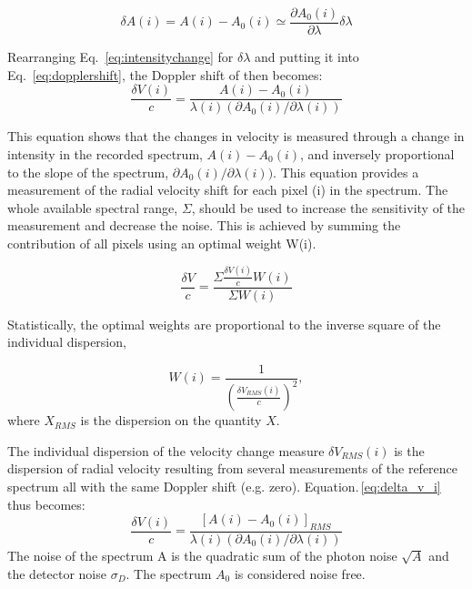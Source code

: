 \begin{equation}
\delta A(i) = A(i) - A_0(i) \simeq \frac{\partial A_0(i)}{\partial \lambda} \delta \lambda
\label{eq:intensitychange}
\end{equation}

Rearranging Eq.~\ref{eq:intensitychange} for \(\delta \lambda\) and putting it into Eq.~\ref{eq:dopplershift}, the Doppler shift of then becomes:
\begin{equation}
    \frac{\delta V(i)}{c} = \frac{A(i) - A_0(i) }{\lambda(i) (\partial A_0(i)/\partial \lambda(i))} \label{eq:delta_v_i}
\end{equation}

This equation shows that the changes in velocity is measured through a change in intensity in the recorded spectrum, \(A(i)-A_0(i)\), and inversely proportional to the slope of the spectrum, \(\partial A_0(i)/\partial \lambda(i))\).
This equation provides a measurement of the radial velocity shift for each pixel (i) in the spectrum. The whole available spectral range, $\Sigma$, should be used to increase the sensitivity of the measurement and decrease the noise. This is achieved by summing the contribution of all pixels using an optimal weight W(i).

\begin{equation}
\frac{\delta V}{c} = \frac{\Sigma{ \frac{\delta V(i)}{c}W(i)}}{\Sigma {W(i)}}
\end{equation}

Statistically, the optimal weights are proportional to the inverse square of the individual dispersion,


\begin{equation}
W(i) = \frac{1}{\left(\frac{\delta V_{RMS}(i)}{c}\right)^2},  \label{eq:weights}
\end{equation}
where $X_{RMS}$ is the dispersion on the quantity $X$.


The individual dispersion of the velocity change measure $\delta V_{RMS}(i)$ is the dispersion of radial velocity resulting from several measurements of the reference spectrum all with the same Doppler shift (e.g. zero). Equation.\,\ref{eq:delta_v_i} thus becomes:
\begin{equation}
    \frac{\delta V(i)}{c} = \frac{{[A(i) - A_0(i)]}_{RMS} }{\lambda(i) (\partial A_0(i)/\partial \lambda(i))} \label{eq:delta_v_i_rms}
\end{equation}
The noise of the spectrum A is the quadratic sum of the photon noise \(\sqrt{A}\) and the detector noise \(\sigma_D\). The spectrum \(A_0\) is considered noise free.

